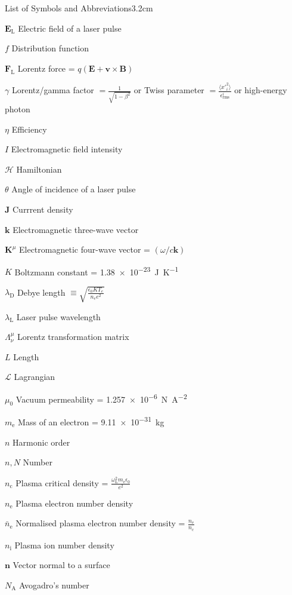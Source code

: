 \begin{mclistof}{List of Symbols and Abbreviations}{3.2cm}
\item[$\mathbf{E}_\mathrm{L}$] Electric field of a laser pulse
\item[$f$] Distribution function
\item[$\mathbf{F}_\mathrm{L}$] Lorentz force = $q(\mathbf{E}+ \mathbf{v}\times \mathbf{B})$
\item[$\gamma$] Lorentz/gamma factor $= \frac{1}{\sqrt{1-\beta^2}}$ or Twiss parameter $= \frac{\langle x'^2_i\rangle}{\epsilon^i_\mathrm{rms}}$ or high-energy photon
\item[$\eta$] Efficiency
\item[$I$] Electromagnetic field intensity
\item[$\mathcal{H}$] Hamiltonian
\item[$\theta$] Angle of incidence of a laser pulse
\item[$\mathbf{J}$] Currrent density
\item[$\mathbf{k}$] Electromagnetic three-wave vector
\item[$\mathbf{K}^\mu$] Electromagnetic four-wave vector = $(\omega/c \mathbf{k})$
\item[$K$] Boltzmann constant = \qty{1.38e-23}{J.K^{-1}}
\item[$\lambda_\mathrm{D}$] Debye length $\equiv \sqrt{\frac{\epsilon_0KT_e}{n_ee^2}}$
\item[$\lambda_\mathrm{L}$] Laser pulse wavelength
\item[$\Lambda^\mu_\nu$] Lorentz transformation matrix
\item[$L$] Length 
\item[$\mathcal{L}$] Lagrangian
\item[$\mu_0$] Vacuum permeability = \qty{1.257e-6}{N.A^{-2}}
\item[$m_\mathrm{e}$] Mass of an electron = \qty{9.11e-31}{kg}
\item[$n$] Harmonic order
\item[$n,N$] Number
\item[$n_\mathrm{c}$] Plasma critical density = $\frac{\omega^2_\mathrm{L}m_\mathrm{e}\epsilon_0}{e^2}$
\item[$n_\mathrm{e}$] Plasma electron number density
\item[$\bar{n}_\mathrm{e}$] Normalised plasma electron number density = $\frac{n_\mathrm{e}}{n_\mathrm{c}}$
\item[$n_\mathrm{i}$] Plasma ion number density
\item[$\mathbf{n}$] Vector normal to a surface
\item[$N_\mathrm{A}$] Avogadro's number

\end{mclistof}
